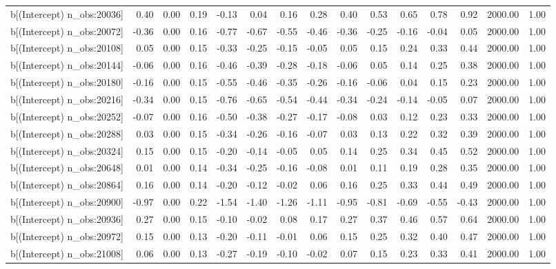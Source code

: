 \begin{table}[ht]
\begin{tabular}{rrrrrrrrrrrrrrr}
  b[(Intercept) n\_obs:20036] & 0.40 & 0.00 & 0.19 & -0.13 & 0.04 & 0.16 & 0.28 & 0.40 & 0.53 & 0.65 & 0.78 & 0.92 & 2000.00 & 1.00 \\ 
  b[(Intercept) n\_obs:20072] & -0.36 & 0.00 & 0.16 & -0.77 & -0.67 & -0.55 & -0.46 & -0.36 & -0.25 & -0.16 & -0.04 & 0.05 & 2000.00 & 1.00 \\ 
  b[(Intercept) n\_obs:20108] & 0.05 & 0.00 & 0.15 & -0.33 & -0.25 & -0.15 & -0.05 & 0.05 & 0.15 & 0.24 & 0.33 & 0.44 & 2000.00 & 1.00 \\ 
  b[(Intercept) n\_obs:20144] & -0.06 & 0.00 & 0.16 & -0.46 & -0.39 & -0.28 & -0.18 & -0.06 & 0.05 & 0.14 & 0.25 & 0.38 & 2000.00 & 1.00 \\ 
  b[(Intercept) n\_obs:20180] & -0.16 & 0.00 & 0.15 & -0.55 & -0.46 & -0.35 & -0.26 & -0.16 & -0.06 & 0.04 & 0.15 & 0.23 & 2000.00 & 1.00 \\ 
  b[(Intercept) n\_obs:20216] & -0.34 & 0.00 & 0.15 & -0.76 & -0.65 & -0.54 & -0.44 & -0.34 & -0.24 & -0.14 & -0.05 & 0.07 & 2000.00 & 1.00 \\ 
  b[(Intercept) n\_obs:20252] & -0.07 & 0.00 & 0.16 & -0.50 & -0.38 & -0.27 & -0.17 & -0.08 & 0.03 & 0.12 & 0.23 & 0.33 & 2000.00 & 1.00 \\ 
  b[(Intercept) n\_obs:20288] & 0.03 & 0.00 & 0.15 & -0.34 & -0.26 & -0.16 & -0.07 & 0.03 & 0.13 & 0.22 & 0.32 & 0.39 & 2000.00 & 1.00 \\ 
  b[(Intercept) n\_obs:20324] & 0.15 & 0.00 & 0.15 & -0.20 & -0.14 & -0.05 & 0.05 & 0.14 & 0.25 & 0.34 & 0.45 & 0.52 & 2000.00 & 1.00 \\ 
  b[(Intercept) n\_obs:20648] & 0.01 & 0.00 & 0.14 & -0.34 & -0.25 & -0.16 & -0.08 & 0.01 & 0.11 & 0.19 & 0.28 & 0.35 & 2000.00 & 1.00 \\ 
  b[(Intercept) n\_obs:20864] & 0.16 & 0.00 & 0.14 & -0.20 & -0.12 & -0.02 & 0.06 & 0.16 & 0.25 & 0.33 & 0.44 & 0.49 & 2000.00 & 1.00 \\ 
  b[(Intercept) n\_obs:20900] & -0.97 & 0.00 & 0.22 & -1.54 & -1.40 & -1.26 & -1.11 & -0.95 & -0.81 & -0.69 & -0.55 & -0.43 & 2000.00 & 1.00 \\ 
  b[(Intercept) n\_obs:20936] & 0.27 & 0.00 & 0.15 & -0.10 & -0.02 & 0.08 & 0.17 & 0.27 & 0.37 & 0.46 & 0.57 & 0.64 & 2000.00 & 1.00 \\ 
  b[(Intercept) n\_obs:20972] & 0.15 & 0.00 & 0.13 & -0.20 & -0.11 & -0.01 & 0.06 & 0.15 & 0.25 & 0.32 & 0.40 & 0.47 & 2000.00 & 1.00 \\ 
  b[(Intercept) n\_obs:21008] & 0.06 & 0.00 & 0.13 & -0.27 & -0.19 & -0.10 & -0.02 & 0.07 & 0.15 & 0.23 & 0.33 & 0.41 & 2000.00 & 1.00 \\ 

\end{tabular}
\end{table}
